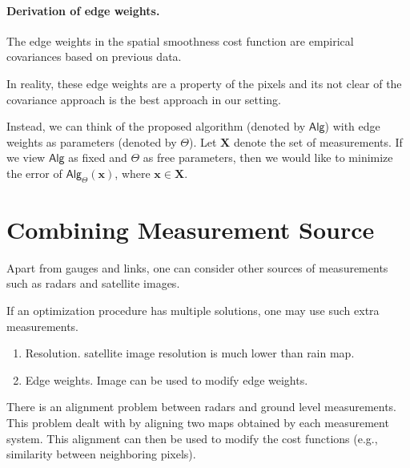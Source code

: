 \documentclass[12pt]{article}
\newcommand{\alg}{\ensuremath{\textsf{Alg}}\xspace}
\newcommand{\params}{\ensuremath{\Theta}\xspace}
\newcommand{\measurements}{\ensuremath{\mathbf{X}}\xspace}
\begin{document}
\paragraph{Derivation of edge weights.} The edge weights in the spatial smoothness cost function are empirical covariances based on previous data.


In reality, these edge weights are a property of the pixels and its not clear of the covariance approach is the best approach in our setting.

Instead, we can think of the proposed algorithm (denoted by \alg) with edge weights as parameters (denoted by \params). Let $\measurements$ denote the set of measurements. If we view \alg as fixed and $\params$ as free parameters, then we would like to minimize the error of $\alg_{\params}(\mathbf{x})$, where $\mathbf{x}\in\measurements$. 

\section{Combining Measurement Source}
Apart from gauges and links, one can consider other sources of measurements such as radars and satellite images. 

If an optimization procedure has multiple solutions, one may use such extra measurements. 

\begin{enumerate}
    \item Resolution. satellite image resolution is much lower than rain map.
    \item Edge weights. Image can be used to modify edge weights.
\end{enumerate}

There is an alignment problem between radars and ground level measurements. This problem dealt with by aligning two maps obtained by each measurement system. 
This alignment can then be used to modify the cost functions (e.g., similarity between neighboring pixels).
\end{document}
